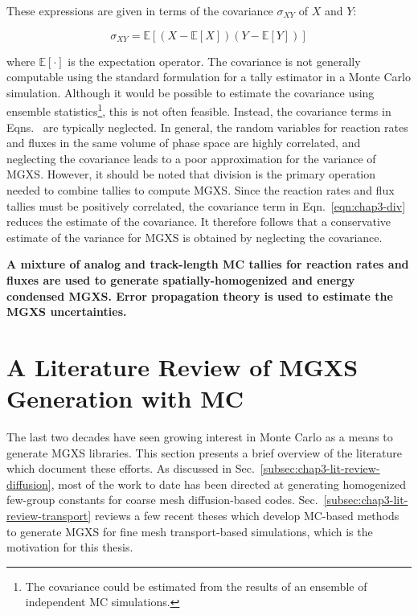 \vspace{-0.4in}

\noindent These expressions are given in terms of the covariance $\sigma_{XY}$ of $X$ and $Y$:

\vspace{-0.1in}

\begin{equation}
\label{eqn:chap3-covariance}
\sigma_{XY} = \mathbb{E}[(X - \mathbb{E}[X])(Y - \mathbb{E}[Y])]
\end{equation}

\noindent where $\mathbb{E}[\cdot]$ is the expectation operator. The covariance is not generally computable using the standard formulation for a tally estimator in a Monte Carlo simulation. Although it would be possible to estimate the covariance using ensemble statistics\footnote{The covariance could be estimated from the results of an ensemble of independent \ac{MC} simulations.}, this is not often feasible. Instead, the covariance terms in Eqns.~ are typically neglected. In general, the random variables for reaction rates and fluxes in the same volume of phase space are highly correlated, and neglecting the covariance leads to a poor approximation for the variance of \ac{MGXS}. However, it should be noted that division is the primary operation needed to combine tallies to compute \ac{MGXS}. Since the reaction rates and flux tallies must be positively correlated, the covariance term in Eqn.~\ref{eqn:chap3-div} reduces the estimate of the covariance. It therefore follows that a conservative estimate of the variance for \ac{MGXS} is obtained by neglecting the covariance.

\begin{emphbox}
\textbf{A mixture of analog and track-length \ac{MC} tallies for reaction rates and fluxes are used to generate spatially-homogenized and energy condensed \ac{MGXS}. Error propagation theory is used to estimate the \ac{MGXS} uncertainties.}
\end{emphbox}


\section{A Literature Review of MGXS Generation with MC}
\label{sec:chap3-lit-review}

The last two decades have seen growing interest in Monte Carlo as a means to generate \ac{MGXS} libraries. This section presents a brief overview of the literature which document these efforts. As discussed in Sec.~\ref{subsec:chap3-lit-review-diffusion}, most of the work to date has been directed at generating homogenized few-group constants for coarse mesh diffusion-based codes. Sec.~\ref{subsec:chap3-lit-review-transport} reviews a few recent theses which develop \ac{MC}-based methods to generate \ac{MGXS} for fine mesh transport-based simulations, which is the motivation for this thesis.


